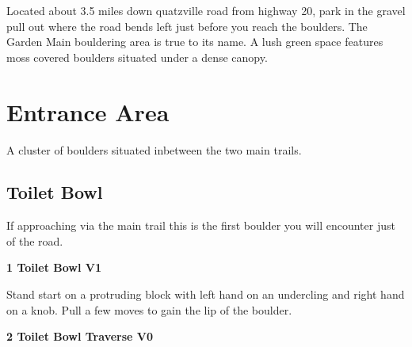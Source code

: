 \raggedcolumns
\begin{multicols}{2}

\begin{minipage}{\columnwidth}
Located about 3.5 miles down quatzville road from highway 20, park in the gravel pull out where the road bends left just before you reach the boulders. The Garden Main bouldering area is true to its name. A lush green space features moss covered boulders situated under a dense canopy.
\end{minipage}

\newpage

		\section{Entrance Area}\label{sa:Entrance Area}
	\begin{minipage}{\columnwidth}
	A cluster of boulders situated inbetween the two main trails.
	\end{minipage}
	
			\begin{minipage}{\columnwidth}
			\subsection*{Toilet Bowl}\label{bf:Toilet Bowl}
			If approaching via the main trail this is the first boulder you will encounter just of the road.
			
			\end{minipage}
			

					\begin{minipage}{\linewidth}	
					\label{rt:Toilet Bowl}
\colorbox{green!20}{
\parbox{0.95\textwidth}{
\textbf{
1 Toilet Bowl V1   
}
}
}

					\begin{adjustwidth}{0.5cm}{}				
					Stand start on a protruding block with left hand on an undercling and right hand on a knob. Pull a few moves to gain the lip of the boulder.
					\end{adjustwidth}
					\end{minipage}
					\begin{minipage}{\linewidth}	
					\label{rt:Toilet Bowl Traverse}
\colorbox{green!20}{
\parbox{0.95\textwidth}{
\textbf{
2 Toilet Bowl Traverse V0    
}
}
}


\end{minipage}
\end{multicols}
